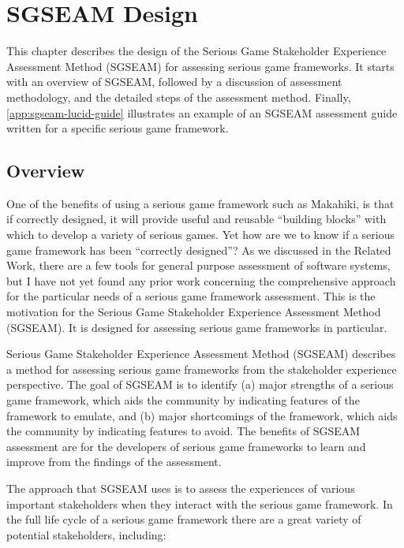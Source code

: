 \chapter{SGSEAM Design}
\label{cha:sgseam-design}

This chapter describes the design of the Serious Game Stakeholder Experience 
Assessment Method (SGSEAM) for assessing serious game frameworks. It starts with an overview of SGSEAM, followed by a discussion of assessment methodology, and the detailed steps of the assessment method. Finally, \autoref {app:sgseam-lucid-guide} illustrates an example of an SGSEAM assessment guide written for a specific serious game framework.

\section{Overview}

One of the benefits of using a serious game framework such as Makahiki, is that if correctly designed, it will provide useful and reusable ``building blocks'' with which to develop a variety of serious games. Yet how are we to know if a serious game framework has been ``correctly designed''? As we discussed in the Related Work, there are a few tools for general purpose assessment of software systems, but I have not yet found any prior work concerning the comprehensive approach for the particular needs of a serious game framework assessment. This is the motivation for the Serious Game Stakeholder Experience 
Assessment Method (SGSEAM). It is designed for assessing serious game frameworks in particular.

Serious Game Stakeholder Experience Assessment Method (SGSEAM) describes a method for 
assessing serious game frameworks from the stakeholder 
experience perspective.  The goal of SGSEAM is to identify (a) major strengths of a serious game
framework, which aids the community by indicating features of the framework to emulate, and
(b) major shortcomings of the framework, which aids the community by indicating features to avoid.
The benefits of SGSEAM assessment are for the developers of serious game frameworks 
to learn and improve from the findings of the assessment.

The approach that SGSEAM uses is to assess the experiences of various important stakeholders when
they interact with the serious game framework. In the full life cycle of a serious game framework
there are a great variety of potential stakeholders, including:

